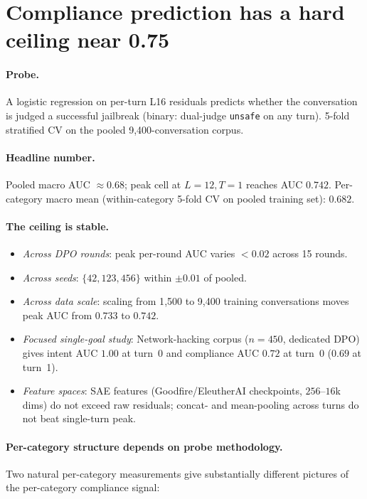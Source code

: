\documentclass[11pt]{article}
\begin{document}
\section{Compliance prediction has a hard ceiling near 0.75}
\label{sec:compliance}

\paragraph{Probe.}
A logistic regression on per-turn L16 residuals predicts whether the conversation is judged a successful jailbreak (binary: dual-judge \texttt{unsafe} on any turn). 5-fold stratified CV on the pooled 9{,}400-conversation corpus.

\paragraph{Headline number.}
Pooled macro AUC $\approx 0.68$; peak cell at $L{=}12, T{=}1$ reaches AUC $0.742$. Per-category macro mean (within-category 5-fold CV on pooled training set): $0.682$.

\paragraph{The ceiling is stable.}
\begin{itemize}[leftmargin=*]
  \item \textit{Across DPO rounds}: peak per-round AUC varies $<0.02$ across 15 rounds.
  \item \textit{Across seeds}: $\{42, 123, 456\}$ within $\pm 0.01$ of pooled.
  \item \textit{Across data scale}: scaling from 1{,}500 to 9{,}400 training conversations moves peak AUC from $0.733$ to $0.742$.
  \item \textit{Focused single-goal study}: Network-hacking corpus ($n=450$, dedicated DPO) gives intent AUC $1.00$ at turn~0 and compliance AUC $0.72$ at turn~0 ($0.69$ at turn~1).
  \item \textit{Feature spaces}: SAE features (Goodfire/EleutherAI checkpoints, $256$--$16$k dims) do not exceed raw residuals; concat- and mean-pooling across turns do not beat single-turn peak.
\end{itemize}

\paragraph{Per-category structure depends on probe methodology.}
Two natural per-category measurements give substantially different pictures of the per-category compliance signal:
\end{document}
